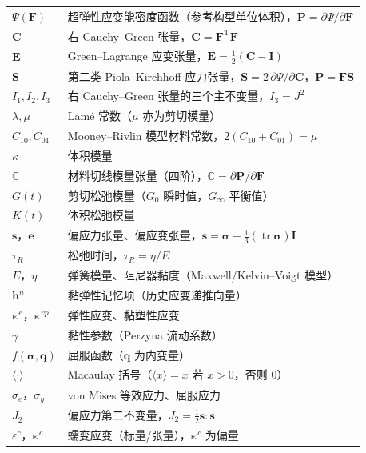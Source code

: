 \begin{longtable}{@{}p{4.8cm}>{\raggedright\arraybackslash}p{10.2cm}@{}}
  $\Psi(\mathbf{F})$ & 超弹性应变能密度函数（参考构型单位体积），$\mathbf{P}=\partial\Psi/\partial\mathbf{F}$ \\
  $\mathbf{C}$ & 右 Cauchy--Green 张量，$\mathbf{C}=\mathbf{F}^{\mathrm{T}}\mathbf{F}$ \\
  $\mathbf{E}$ & Green--Lagrange 应变张量，$\mathbf{E}=\tfrac{1}{2}(\mathbf{C}-\mathbf{I})$ \\
  $\mathbf{S}$ & 第二类 Piola--Kirchhoff 应力张量，$\mathbf{S}=2\,\partial\Psi/\partial\mathbf{C}$，$\mathbf{P}=\mathbf{F}\mathbf{S}$ \\
  $I_1,I_2,I_3$ & 右 Cauchy--Green 张量的三个主不变量，$I_3=J^{2}$ \\
  $\lambda,\mu$ & Lam\'e 常数（$\mu$ 亦为剪切模量） \\
  $C_{10},C_{01}$ & Mooney--Rivlin 模型材料常数，$2(C_{10}+C_{01})=\mu$ \\
  $\kappa$ & 体积模量 \\
  $\mathbb{C}$ & 材料切线模量张量（四阶），$\mathbb{C}=\partial\mathbf{P}/\partial\mathbf{F}$ \\
  $G(t)$ & 剪切松弛模量（$G_{0}$ 瞬时值，$G_{\infty}$ 平衡值） \\
  $K(t)$ & 体积松弛模量 \\
  $\mathbf{s}$，$\mathbf{e}$ & 偏应力张量、偏应变张量，$\mathbf{s}=\boldsymbol{\sigma}-\tfrac{1}{3}(\operatorname{tr}\boldsymbol{\sigma})\mathbf{I}$ \\
  $\tau_{R}$ & 松弛时间，$\tau_{R}=\eta/E$ \\
  $E$，$\eta$ & 弹簧模量、阻尼器黏度（Maxwell/Kelvin--Voigt 模型） \\
  $\mathbf{h}^{n}$ & 黏弹性记忆项（历史应变递推向量） \\
  $\boldsymbol{\varepsilon}^{e}$，$\boldsymbol{\varepsilon}^{vp}$ & 弹性应变、黏塑性应变 \\
  $\gamma$ & 黏性参数（Perzyna 流动系数） \\
  $f(\boldsymbol{\sigma},\boldsymbol{q})$ & 屈服函数（$\boldsymbol{q}$ 为内变量） \\
  $\langle\cdot\rangle$ & Macaulay 括号（$\langle x\rangle=x$ 若 $x>0$，否则 $0$） \\
  $\sigma_{e}$，$\sigma_{y}$ & von Mises 等效应力、屈服应力 \\
  $J_{2}$ & 偏应力第二不变量，$J_{2}=\tfrac{1}{2}\mathbf{s}:\mathbf{s}$ \\
  $\varepsilon^{c}$，$\boldsymbol{\varepsilon}^{c}$ & 蠕变应变（标量/张量），$\boldsymbol{\varepsilon}^{c}$ 为偏量 \\

\end{longtable}
